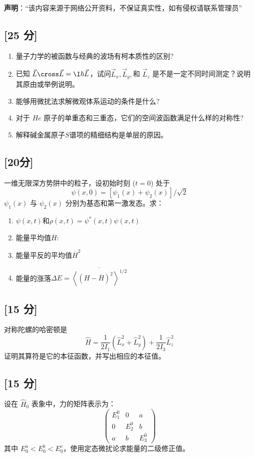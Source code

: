 
\textbf{声明}：“该内容来源于网络公开资料，不保证真实性，如有侵权请联系管理员”

\subsection{[25 分]}
\begin{enumerate}
\item 量子力学的被函数与经典的波场有柯本质性的区别?
\item 已知 $\vec L \cross \vec L = \I \hbar \vec L$，试问$\vec L_x, \vec L_y,$和 $\vec L_z$ 是不是一定不同时间测定？说明其原由或举例说明。
\item 能够用微扰法求解微观体系运动的条件是什么?
\item 对于 $He$ 原子的单重态和三重态，它们的空间波函数满足什么样的对称性?
\item 解释碱金属原子$S$谱项的精细结构是单层的原因。
\end{enumerate}
\subsection{[20分]}
一维无限深方势阱中的粒子，设初始时刻 ($t = 0$) 处于
\[
\psi(x, 0) = [\psi_1(x) + \psi_2(x)]/\sqrt{2}~
\]
$\psi_1(x)$ 与 $\psi_2(x)$ 分别为基态和第一激发态。求：
\begin{enumerate}
\item $\psi(x, t)$和$\rho(x,t) = \psi^*(x,t)\psi(x,t)$
\item 能量平均值$\overline{H} $:
\item 能量平反的平均值$\overline{H}^2 $
\item 能量的涨落$\Delta E =\overline{\left\langle \left( H - \overline{H} \right)^2\right\rangle^{1/2}}$
\end{enumerate}
\subsection{[15 分]}
对称陀螺的哈密顿是\[\hat{H} = \frac{1}{2I_1} \left( \hat{L}_x^2 + \hat{L}_y^2 \right) + \frac{1}{2I_3} \hat{L}_z^2~\]
证明其算符是它的本征函数，并写出相应的本征值。
\subsection{[15 分]}
设在 $\hat H_0$ 表象中，力的矩阵表示为：
\[
\begin{pmatrix}
E_1^0 & 0 & a \\
0 & E_2^0 & b \\
a^. & b & E_3^0
\end{pmatrix}~
\]
其中 $E_0^a < E_0^b < E_0^c$，使用定态微扰论求能量的二级修正值。